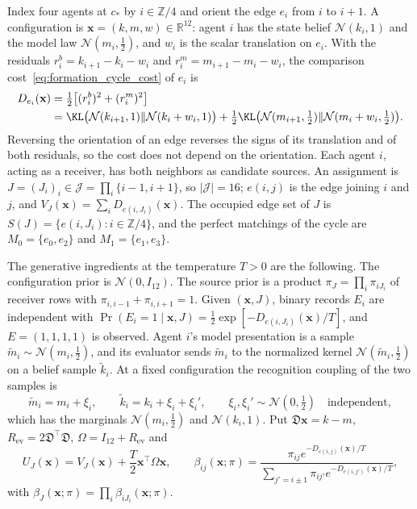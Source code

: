 \begin{definition}\label{def:fourcycle_model}
Index four agents at $c_*$ by $i\in\mathbb Z/4$ and orient the edge $e_i$ from $i$ to $i+1$. A configuration is $\mathbf x=(k,m,w)\in\mathbb R^{12}$: agent $i$ has the state belief $\mathcal N(k_i,1)$ and the model law $\mathcal N(m_i,\frac12)$, and $w_i$ is the scalar translation on $e_i$. With the residuals $r^b_i=k_{i+1}-k_i-w_i$ and $r^m_i=m_{i+1}-m_i-w_i$, the comparison cost~\eqref{eq:formation_cycle_cost} of $e_i$ is
\[
\begin{aligned}
D_{e_i}(\mathbf x)&=\tfrac12\bigl[(r^b_i)^2+(r^m_i)^2\bigr]\\
&=\KL\bigl(\mathcal N(k_{i+1},1)\Vert\mathcal N(k_i+w_i,1)\bigr)
+\tfrac12\KL\bigl(\mathcal N(m_{i+1},\tfrac12)\Vert\mathcal N(m_i+w_i,\tfrac12)\bigr).
\end{aligned}
\]
Reversing the orientation of an edge reverses the signs of its translation and of both residuals, so the cost does not depend on the orientation. Each agent $i$, acting as a receiver, has both neighbors as candidate sources. An assignment is $J=(J_i)_i\in\mathcal J=\prod_i\{i-1,i+1\}$, so $|\mathcal J|=16$; $e(i,j)$ is the edge joining $i$ and $j$, and $V_J(\mathbf x)=\sum_iD_{e(i,J_i)}(\mathbf x)$. The occupied edge set of $J$ is $S(J)=\{e(i,J_i):i\in\mathbb Z/4\}$, and the perfect matchings of the cycle are $M_0=\{e_0,e_2\}$ and $M_1=\{e_1,e_3\}$.

The generative ingredients at the temperature $T>0$ are the following. The configuration prior is $\mathcal N(0,I_{12})$. The source prior is a product $\pi_J=\prod_i\pi_{iJ_i}$ of receiver rows with $\pi_{i,i-1}+\pi_{i,i+1}=1$. Given $(\mathbf x,J)$, binary records $E_i$ are independent with $\Pr(E_i=1\mid\mathbf x,J)=\frac12\exp[-D_{e(i,J_i)}(\mathbf x)/T]$, and $E=(1,1,1,1)$ is observed. Agent $i$'s model presentation is a sample $\tilde m_i\sim\mathcal N(m_i,\frac12)$, and its evaluator sends $\tilde m_i$ to the normalized kernel $\mathcal N(\tilde m_i,\frac12)$ on a belief sample $\tilde k_i$. At a fixed configuration the recognition coupling of the two samples is
\[
\tilde m_i=m_i+\xi_i,\qquad \tilde k_i=k_i+\xi_i+\xi_i',\qquad
\xi_i,\xi_i'\sim\mathcal N(0,\tfrac12)\quad\text{independent},
\]
which has the marginals $\mathcal N(m_i,\frac12)$ and $\mathcal N(k_i,1)$. Put $\mathfrak D\mathbf x=k-m$, $R_{\mathrm{ev}}=2\mathfrak D^\top\mathfrak D$, $\Omega=I_{12}+R_{\mathrm{ev}}$ and
\begin{equation}
U_J(\mathbf x)=V_J(\mathbf x)+\frac T2\mathbf x^\top\Omega\mathbf x,\qquad
\beta_{ij}(\mathbf x;\pi)=\frac{\pi_{ij}e^{-D_{e(i,j)}(\mathbf x)/T}}{\sum_{j'=i\pm1}\pi_{ij'}e^{-D_{e(i,j')}(\mathbf x)/T}},
\label{eq:sel_energy_rows}
\end{equation}
with $\beta_J(\mathbf x;\pi)=\prod_i\beta_{iJ_i}(\mathbf x;\pi)$.


\end{definition}
